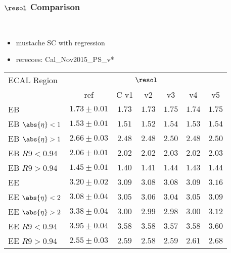 \documentclass[8pt,serif]{beamer}
\begin{document}
\newcommand{\hlcell}{\cellcolor{green!30!white}}
\newcommand{\hlcellblue}{\cellcolor{red!30!white}}


\begin{frame}
  \frametitle{$\resol $ Comparison}
\\

\begin{itemize}
  \item mustache SC with regression
  \item rerecoes: Cal\_Nov2015\_PS\_v*
  \end{itemize}
  
  \begin{center}
    \emph{\dataSample}\xspace \invMassVarName

\tiny \begin{tabular}{|l|c|c|c|c|c|c|} \hline  
ECAL Region & \multicolumn{6}{c|}{$\resol$} \\
            & ref  & C v1  & v2  &  v3  &  v4  &  v5  \\ 
\hline           
EB                  & $1.73 \pm 0.01$ & $1.73$ & $1.73$ & \hlcellblue $1.75$ & $1.74$ & $1.75$ \\
EB $\abs{\eta} < 1$ & $1.53 \pm 0.01$ & $1.51$ & $1.52$ & $1.54$ & $1.53$ & $1.54$ \\
EB $\abs{\eta} > 1$ & $2.66 \pm 0.03$ & \hlcell $2.48$ & \hlcell $2.48$ & \hlcellblue $2.50$ & \hlcell $2.48$ & $2.50$ \\
EB $R9 < 0.94$      & $2.06 \pm 0.01$ & $2.02$ & $2.02$ & $2.03$ & $2.02$ & $2.03$ \\
EB $R9 > 0.94$      & $1.45 \pm 0.01$ & \hlcell $1.40$ & \hlcell $1.41$ & \hlcellblue $1.44$ & $1.43$ & $1.44$ \\
\hline
EE                  & $3.20 \pm 0.02$ & $3.09$ & $3.08$ & \hlcell $3.08$ & $3.09$ & $3.16$ \\
EE $\abs{\eta} < 2$ & $3.08 \pm 0.04$ & $3.05$ & $3.06$ & \hlcell $3.04$ & $3.05$ & $3.09$ \\
EE $\abs{\eta} > 2$ & $3.38 \pm 0.04$ & $3.00$ & $2.99$ & \hlcell $2.98$ & $3.00$ & $3.12$ \\
EE $R9 < 0.94$      & $3.95 \pm 0.04$ & $3.58$ & $3.58$ & \hlcell $3.57$ & $3.58$ & $3.60$ \\
EE $R9 > 0.94$      & $2.55 \pm 0.03$ & $2.59$ & $2.58$ & \hlcell $2.59$ & $2.61$ & $2.68$ \\
\hline  
\end{tabular} 
  \end{center}


\end{frame}
\end{document}
